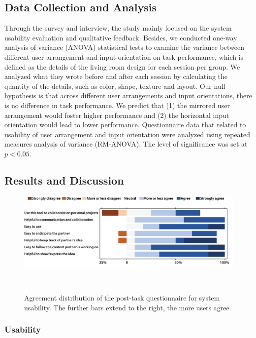 \documentclass{sigchi}
\begin{document}
\subsection{Data Collection and Analysis}
Through the survey and interview, the study mainly focused on the system usability evaluation and qualitative feedback. Besides, we conducted one-way analysis of variance (ANOVA) statistical tests to examine the variance between different user arrangement and input orientation on task performance, which is defined as the details of the living room design for each session per group. We analyzed what they wrote before and after each session by calculating the quantity of the details, such as color, shape, texture and layout. Our null hypothesis is that across different user arrangements and input orientations, there is no difference in task performance. We predict that (1) the mirrored user arrangement would foster higher performance and (2) the horizontal input orientation would lead to lower performance. Questionnaire data that related to usability of user arrangement and input orientation were analyzed using repeated measures analysis of variance (RM-ANOVA). The level of significance was set at $p<0.05$.

\subsection{Results and Discussion} 
\begin{figure}[tb!]
 \centering
 \includegraphics[width=0.98\columnwidth]{usability.png}
 \caption{Agreement distribution of the post-task questionnaire for system usability. The further bars extend to the right, the more users agree.
 }~\label{fig:usability}
\end{figure}
\subsubsection{Usability}
\end{document}
